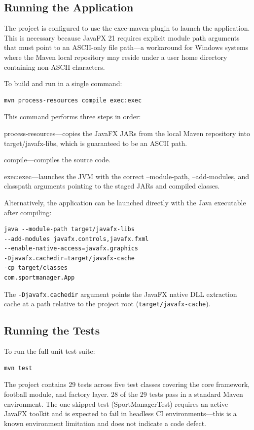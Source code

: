 \documentclass[11pt,a4paper]{article}
\begin{document}
\subsection*{Running the Application}

The project is configured to use the exec-maven-plugin to launch the application. This is necessary because JavaFX 21 requires explicit module path arguments that must point to an ASCII-only file path---a workaround for Windows systems where the Maven local repository may reside under a user home directory containing non-ASCII characters.

To build and run in a single command:

\begin{verbatim}
mvn process-resources compile exec:exec
\end{verbatim}

This command performs three steps in order:

process-resources---copies the JavaFX JARs from the local Maven repository into target/javafx-libs, which is guaranteed to be an ASCII path.

compile---compiles the source code.

exec:exec---launches the JVM with the correct --module-path, --add-modules, and classpath arguments pointing to the staged JARs and compiled classes.

Alternatively, the application can be launched directly with the Java executable after compiling:

\begin{verbatim}
java --module-path target/javafx-libs
--add-modules javafx.controls,javafx.fxml
--enable-native-access=javafx.graphics
-Djavafx.cachedir=target/javafx-cache
-cp target/classes
com.sportmanager.App
\end{verbatim}

The \texttt{-Djavafx.cachedir} argument points the JavaFX native DLL extraction cache at a path relative to the project root (\texttt{target/javafx-cache}).

\subsection*{Running the Tests}

To run the full unit test suite:

\begin{verbatim}
mvn test
\end{verbatim}

The project contains 29 tests across five test classes covering the core framework, football module, and factory layer. 28 of the 29 tests pass in a standard Maven environment. The one skipped test (SportManagerTest) requires an active JavaFX toolkit and is expected to fail in headless CI environments---this is a known environment limitation and does not indicate a code defect.
\end{document}
